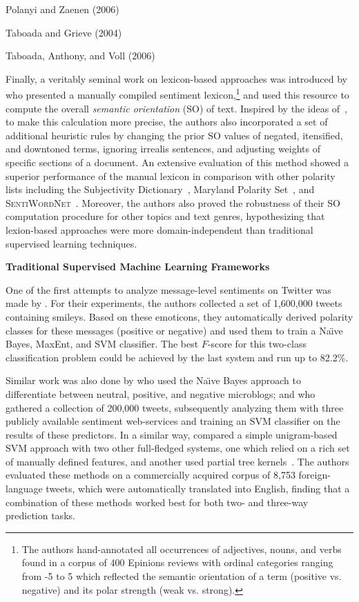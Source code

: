 Polanyi and Zaenen (2006)

\citet{Kennedy:06}

Taboada and Grieve (2004)

Taboada, Anthony, and Voll (2006)

Finally, a veritably seminal work on lexicon-based approaches was
introduced by~\citet{Taboada:11} who presented a manually compiled
sentiment lexicon,\footnote{The authors hand-annotated all occurrences
  of adjectives, nouns, and verbs found in a corpus of 400 Epinions
  reviews with ordinal categories ranging from -5 to 5 which reflected
  the semantic orientation of a term (positive vs. negative) and its
  polar strength (weak vs. strong).} and used this resource to compute
the overall \emph{semantic orientation} (SO) of text.  Inspired by the
ideas of~\citet{Polanyi:06}, to make this calculation more precise,
the authors also incorporated a set of additional heuristic rules by
changing the prior SO values of negated, itensified, and downtoned
terms, ignoring irrealis sentences, and adjusting weights of specific
sections of a document.  An extensive evaluation of this method showed
a superior performance of the manual lexicon in comparison with other
polarity lists including the Subjectivity Dictionary~\cite{Wilson:05},
Maryland Polarity Set~\cite{Mohammad:09}, and
\textsc{SentiWordNet}~\cite{Esuli:06c}.  Moreover, the authors also
proved the robustness of their SO computation procedure for other
topics and text genres, hypothesizing that lexion-based approaches
were more domain-independent than traditional supervised learning
techniques.

\textbf{Traditional Supervised Machine Learning Frameworks}

One of the first attempts to analyze message-level sentiments on
Twitter was made by \citet{Go:09}.  For their experiments, the authors
collected a set of 1,600,000 tweets containing smileys.  Based on
these emoticons, they automatically derived polarity classes for these
messages (positive or negative) and used them to train a Na\"{\i}ve
Bayes, MaxEnt, and SVM classifier.  The best $F$-score for this
two-class classification problem could be achieved by the last system
and run up to 82.2\%.

Similar work was also done by \citet{Pak:10} who used the Na\"{\i}ve
Bayes approach to differentiate between neutral, positive, and
negative microblogs; and \citet{Barbosa:10} who gathered a collection
of 200,000 tweets, subsequently analyzing them with three publicly
available sentiment web-services and training an SVM classifier on the
results of these predictors.  In a similar way, \citet{Agarwal:11}
compared a simple unigram-based SVM approach with two other
full-fledged systems, one which relied on a rich set of manually
defined features, and another used partial tree
kernels~\cite{Moschitti:06}.  The authors evaluated these methods on a
commercially acquired corpus of 8,753 foreign-language tweets, which
were automatically translated into English, finding that a combination
of these methods worked best for both two- and three-way prediction
tasks.

